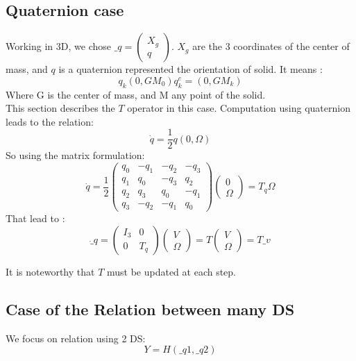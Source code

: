 \subsection{Quaternion case}
Working in 3D, we chose $\_q= \left(\begin{array}{l} X_g \\q \end{array}\right) $. $X_g$ are the 3 coordinates of the center of mass, and $q$ is a quaternion
  represented the orientation of solid. It means :
  \[q_k(0,GM_0)q_k^c = (0,GM_k)\]
Where G is the center of mass, and M any point of the solid.\\
This section describes the $T$ operator in this case. Computation using quaternion leads to the relation:
\[\dot q = \frac{1}{2} q (0,\Omega)\]
So using the matrix formulation:
\[\dot q = \frac{1}{2}  \left(\begin{array}{cccc} q_0&-q_1&-q_2&-q_3 \\ q_1&q_0&-q_3&q_2\\
  q_2&q_3&q_0&-q_1\\ q_3&-q_2&-q_1&q_0\end{array}\right)  \left(\begin{array}{c} 0 \\ \Omega
  \end{array}\right) =
  T_q   \Omega  \]
  That lead to :
  \[ \dot \_q = \left(\begin{array}{cc} I_3 & 0 \\ 0 &
  T_q \end{array}\right) \left(\begin{array}{c} V\\ \Omega  \end{array}\right)  = T
  \left(\begin{array}{c} V\\ \Omega  \end{array}\right)=T \_v\]

It is noteworthy that $T$ must be updated at each step.

\subsection{Case of the Relation between many DS}
We focus on relation using 2 DS:
\[Y=H(\_q1,\_q2)\]
